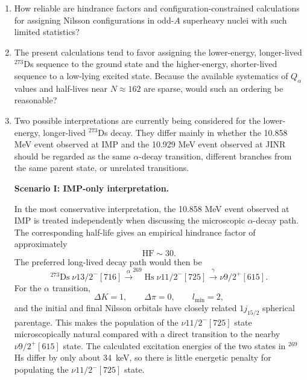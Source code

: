\documentclass[11pt]{article}
\begin{document}
\begin{enumerate}
\item How reliable are hindrance factors and configuration-constrained calculations for assigning Nilsson configurations in odd-$A$ superheavy nuclei with such limited statistics?
\item The present calculations tend to favor assigning the lower-energy, longer-lived $^{273}$Ds sequence to the ground state and the higher-energy, shorter-lived sequence to a low-lying excited state. Because the available systematics of $Q_{\alpha}$ values and half-lives near $N\approx 162$ are sparse, would such an ordering be reasonable?


\item
Two possible interpretations are currently being considered for the
lower-energy, longer-lived $^{273}$Ds decay.
They differ mainly in whether the 10.858 MeV event observed at IMP and
the 10.929 MeV event observed at JINR should be regarded as the same
$\alpha$-decay transition, different branches from the same parent state,
or unrelated transitions.

\medskip

\textbf{Scenario I: IMP-only interpretation.}

In the most conservative interpretation, the 10.858 MeV event observed
at IMP is treated independently when discussing the microscopic
$\alpha$-decay path. The corresponding half-life gives an empirical
hindrance factor of approximately
\[
\mathrm{HF}\sim 30 .
\]
The preferred long-lived decay path would then be
\[
^{273}\mathrm{Ds}\;
\nu 13/2^{-}[716]
\xrightarrow{\alpha}
^{269}\mathrm{Hs}\;
\nu 11/2^{-}[725]
\xrightarrow{\gamma}
\nu 9/2^{+}[615].
\]
For the $\alpha$ transition,
\[
\Delta K=1,\qquad
\Delta\pi=0,\qquad
l_{\min}=2,
\]
and the initial and final Nilsson orbitals have closely related
$1j_{15/2}$ spherical parentage. This makes the population of the
$\nu 11/2^{-}[725]$ state microscopically natural compared with a
direct transition to the nearby $\nu 9/2^{+}[615]$ state.
The calculated excitation energies of the two states in $^{269}$Hs
differ by only about 34~keV, so there is little energetic penalty for
populating the $\nu 11/2^{-}[725]$ state.


\end{enumerate}
\end{document}
